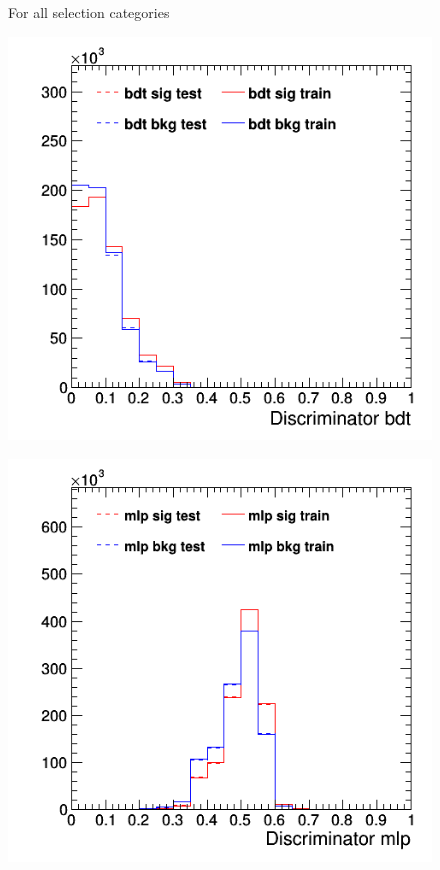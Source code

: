 \documentclass[11pt]{scrartcl}
\begin{document}
	\begin{figure}[H]For all selection categories
	\centering
	\begin{minipage}{.5\textwidth}
	  \centering
	  \includegraphics[width=0.75\linewidth]{figures/MVA/select1/config1/discriminator_bdt.png}
	  \label{fig:distr_s1_config1_bdt}
	\end{minipage}%
	\begin{minipage}{.5\textwidth}
	  \centering
	  \includegraphics[width=0.75\linewidth]{figures/MVA/select1/config1/discriminator_mlp.png}
	  \label{fig:distr_s1_config1_mlp}
	\end{minipage}
	\centering

\end{figure}
\end{document}
